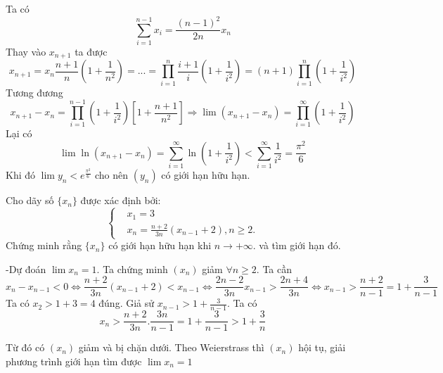 \documentclass[11pt]{scrartcl}
\begin{document}
\begin{itemize}[label=, leftmargin=0em, itemsep=0.5em]
    \begin{sol}
        Ta có \[  \sum_{i = 1}^{n -1} x_i = \frac{(n - 1)^2}{2n}x_{n}  \]
        Thay vào $x_{n + 1}$ ta được
        \[x_{n + 1}  = x_n \frac{n + 1}{n}\left(1 + \frac{1}{n^2}\right) = ... = \prod_{i = 1}^n \frac{i + 1}{i}\left(1 + \frac{1}{i^2}\right) = (n + 1)\prod_{ i =1}^n\left(1 + \frac{1}{i^2}\right)\]
        Tương đương 
        \[x_{n + 1} - x_{n} = \prod_{ i = 1}^{n -1}\left(1 + \frac{1}{i^2}\right)\left[1 + \frac{n + 1}{n^2}\right] \Rightarrow \lim (x_{n + 1} - x_n) = \prod_{ i = 1}^{\infty}\left(1 + \frac{1}{i^2}\right)\]
        Lại có \[\lim \ln(x_{n + 1} - x_n ) = \sum_{i = 1}^{\infty}\ln \left(1 + \frac{1}{i^2}\right) < \sum_{i = 1}^{\infty} \frac{1}{i^2} = \frac{\pi^2}{6}\]
        Khi đó $\lim y_n < e^{\frac{\pi^2}{6}}$ cho nên $(y_n)$ có giới hạn hữu hạn.

    \end{sol}
    \begin{bt}
        Cho dãy số $\{x_n\}$ được xác định bởi: $$\left\{\begin{aligned}& x_1=3 \\ & x_n=\frac{n+2}{3n}(x_{n-1}+2), n\geq 2.\end{aligned}\right.$$
        Chứng minh rằng $\{x_n\}$ có giới hạn hữu hạn khi $n\to+\infty.$ và tìm giới hạn đó.
    \end{bt}

    \begin{sol}
        -Dự đoán $\lim x_n = 1$. Ta chứng minh $(x_n)$ giảm $\forall n \geq 2$. Ta cần \[x_{n} - x_{n-1} < 0 \Leftrightarrow \frac{n + 2}{3n}(x_{n-1} + 2) < x_{n-1} \Leftrightarrow \frac{2n - 2}{3n}x_{n-1} > \frac{2n + 4}{3n} \Leftrightarrow x_{n-1} > \frac{n + 2}{n - 1} = 1 + \frac{3}{n-1}\]
        Ta có $x_2 > 1 + 3 = 4$ đúng. Giả sử $x_{n-1} > 1 + \frac{3}{n -1 }$. Ta có $$x_n > \frac{n + 2}{3n}.\frac{3n}{n - 1} = 1 + \frac{3}{n-1} > 1 + \frac{3}{n}$$

        Từ đó có $(x_n)$ giảm và bị chặn dưới. Theo Weierstrass thì $(x_n)$ hội tụ, giải phương trình giới hạn tìm được $\lim x_n = 1$




\end{sol}
\end{itemize}
\end{document}
